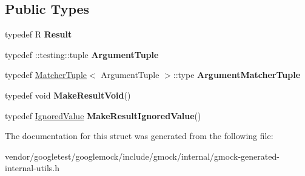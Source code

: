 \subsection*{Public Types}
\begin{DoxyCompactItemize}
\item 
\mbox{\label{structtesting_1_1internal_1_1_function_3_01_r_07_08_4_a5c228a886ef598ac10988f8de5e32ca1}} 
typedef R {\bfseries Result}
\item 
\mbox{\label{structtesting_1_1internal_1_1_function_3_01_r_07_08_4_ad483c3128c470d8cdb55c3ac1c575c11}} 
typedef \+::testing\+::tuple {\bfseries Argument\+Tuple}
\item 
\mbox{\label{structtesting_1_1internal_1_1_function_3_01_r_07_08_4_a9bec5cf8937e8af99dedab2f40129fab}} 
typedef \hyperlink{structtesting_1_1internal_1_1_matcher_tuple}{Matcher\+Tuple}$<$ Argument\+Tuple $>$\+::type {\bfseries Argument\+Matcher\+Tuple}
\item 
\mbox{\label{structtesting_1_1internal_1_1_function_3_01_r_07_08_4_a666b5ad3bf155529d3a0f9fe6d5c897b}} 
typedef void {\bfseries Make\+Result\+Void}()
\item 
\mbox{\label{structtesting_1_1internal_1_1_function_3_01_r_07_08_4_aa459093a5b52ef54e2544b5a6c054383}} 
typedef \hyperlink{classtesting_1_1internal_1_1_ignored_value}{Ignored\+Value} {\bfseries Make\+Result\+Ignored\+Value}()
\end{DoxyCompactItemize}


The documentation for this struct was generated from the following file\+:\begin{DoxyCompactItemize}
\item 
vendor/googletest/googlemock/include/gmock/internal/gmock-\/generated-\/internal-\/utils.\+h\end{DoxyCompactItemize}
